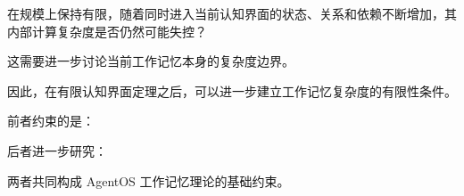在规模上保持有限，随着同时进入当前认知界面的状态、关系和依赖不断增加，其内部计算复杂度是否仍然可能失控？

这需要进一步讨论当前工作记忆本身的复杂度边界。

因此，在有限认知界面定理之后，可以进一步建立工作记忆复杂度的有限性条件。

前者约束的是：

\begin{statementbox}
\centering
{}
\end{statementbox}

后者进一步研究：

\begin{statementbox}
\centering
{}
\end{statementbox}

两者共同构成 AgentOS 工作记忆理论的基础约束。

